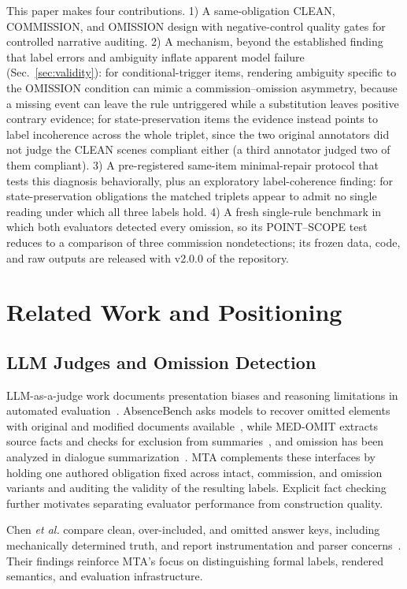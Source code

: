 \documentclass{ieeeaccess}
\begin{document}
This paper makes four contributions. 1) A same-obligation CLEAN, COMMISSION, and OMISSION design with negative-control quality gates for controlled narrative auditing. 2) A mechanism, beyond the established finding that label errors and ambiguity inflate apparent model failure (Sec.~\ref{sec:validity}): for conditional-trigger items, rendering ambiguity specific to the OMISSION condition can mimic a commission--omission asymmetry, because a missing event can leave the rule untriggered while a substitution leaves positive contrary evidence; for state-preservation items the evidence instead points to label incoherence across the whole triplet, since the two original annotators did not judge the CLEAN scenes compliant either (a third annotator judged two of them compliant). 3) A pre-registered same-item minimal-repair protocol that tests this diagnosis behaviorally, plus an exploratory label-coherence finding: for state-preservation obligations the matched triplets appear to admit no single reading under which all three labels hold. 4) A fresh single-rule benchmark in which both evaluators detected every omission, so its POINT--SCOPE test reduces to a comparison of three commission nondetections; its frozen data, code, and raw outputs are released with v2.0.0 of the repository.

\section{Related Work and Positioning}
\subsection{LLM Judges and Omission Detection}
LLM-as-a-judge work documents presentation biases and reasoning limitations in automated evaluation~\cite{zheng2023judge}. AbsenceBench asks models to recover omitted elements with original and modified documents available~\cite{fu2025absence}, while MED-OMIT extracts source facts and checks for exclusion from summaries~\cite{schumacher2025medomit}, and omission has been analyzed in dialogue summarization~\cite{zou2023omission}. MTA complements these interfaces by holding one authored obligation fixed across intact, commission, and omission variants and auditing the validity of the resulting labels. Explicit fact checking~\cite{min2023factscore,thorne2018fever} further motivates separating evaluator performance from construction quality.

Chen \emph{et al.} compare clean, over-included, and omitted answer keys, including mechanically determined truth, and report instrumentation and parser concerns~\cite{chen2026enumerating}. Their findings reinforce MTA's focus on distinguishing formal labels, rendered semantics, and evaluation infrastructure.
\end{document}
